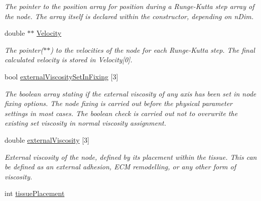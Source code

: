 \begin{DoxyCompactItemize}
\begin{DoxyCompactList}\small\item\em The pointer to the position array for position during a Runge-\/\+Kutta step array of the node. The array itself is declared within the constructor, depending on n\+Dim. \end{DoxyCompactList}\item 
\hypertarget{classNode_ac27dee69b570030aacf8865190879845}{}double $\ast$$\ast$ \hyperlink{classNode_ac27dee69b570030aacf8865190879845}{Velocity}\label{classNode_ac27dee69b570030aacf8865190879845}

\begin{DoxyCompactList}\small\item\em The pointer($\ast$$\ast$) to the velocities of the node for each Runge-\/\+Kutta step. The final calculated velocity is stored in Velocity\mbox{[}0\mbox{]}. \end{DoxyCompactList}\item 
\hypertarget{classNode_a03f2f0310bec3504b082d0f707fa3db2}{}bool \hyperlink{classNode_a03f2f0310bec3504b082d0f707fa3db2}{external\+Viscosity\+Set\+In\+Fixing} \mbox{[}3\mbox{]}\label{classNode_a03f2f0310bec3504b082d0f707fa3db2}

\begin{DoxyCompactList}\small\item\em The boolean array stating if the external viscosity of any axis has been set in node fixing options. The node fixing is carried out before the physical parameter settings in most cases. The boolean check is carried out not to overwrite the existing set viscosity in normal viscosity assignment. \end{DoxyCompactList}\item 
\hypertarget{classNode_a9bb34133d43eb0f29bfd0d0b65df395d}{}double \hyperlink{classNode_a9bb34133d43eb0f29bfd0d0b65df395d}{external\+Viscosity} \mbox{[}3\mbox{]}\label{classNode_a9bb34133d43eb0f29bfd0d0b65df395d}

\begin{DoxyCompactList}\small\item\em External viscosity of the node, defined by its placement within the tissue. This can be defined as an external adhesion, E\+C\+M remodelling, or any other form of viscosity. \end{DoxyCompactList}\item 
\hypertarget{classNode_af754322e3928dc45f70b19762551890a}{}int \hyperlink{classNode_af754322e3928dc45f70b19762551890a}{tissue\+Placement}\label{classNode_af754322e3928dc45f70b19762551890a}


\end{DoxyCompactItemize}
